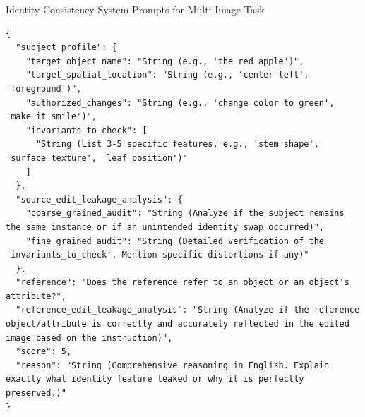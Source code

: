 \begin{promptbox}[label={System Prompts: IC_Multi-Image}]{Identity Consistency System Prompts for Multi-Image Task}
\begin{lstlisting}
{
  "subject_profile": {
    "target_object_name": "String (e.g., 'the red apple')",
    "target_spatial_location": "String (e.g., 'center left', 'foreground')",
    "authorized_changes": "String (e.g., 'change color to green', 'make it smile')",
    "invariants_to_check": [
      "String (List 3-5 specific features, e.g., 'stem shape', 'surface texture', 'leaf position')"
    ]
  },
  "source_edit_leakage_analysis": {
    "coarse_grained_audit": "String (Analyze if the subject remains the same instance or if an unintended identity swap occurred)",
    "fine_grained_audit": "String (Detailed verification of the 'invariants_to_check'. Mention specific distortions if any)"
  },
  "reference": "Does the reference refer to an object or an object's attribute?",
  "reference_edit_leakage_analysis": "String (Analyze if the reference object/attribute is correctly and accurately reflected in the edited image based on the instruction)",
  "score": 5,
  "reason": "String (Comprehensive reasoning in English. Explain exactly what identity feature leaked or why it is perfectly preserved.)"
}
\end{lstlisting}

\end{promptbox}

\clearpage

